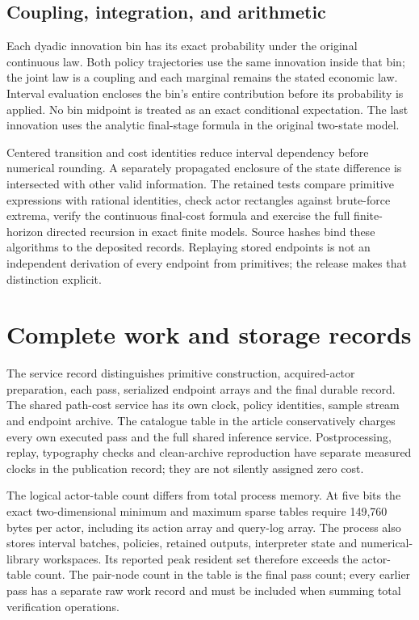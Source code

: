 \subsection{Coupling, integration, and arithmetic}
Each dyadic innovation bin has its exact probability under the original continuous law. Both policy trajectories use the same innovation inside that bin; the joint law is a coupling and each marginal remains the stated economic law. Interval evaluation encloses the bin's entire contribution before its probability is applied. No bin midpoint is treated as an exact conditional expectation. The last innovation uses the analytic final-stage formula in the original two-state model.

Centered transition and cost identities reduce interval dependency before numerical rounding. A separately propagated enclosure of the state difference is intersected with other valid information. The retained tests compare primitive expressions with rational identities, check actor rectangles against brute-force extrema, verify the continuous final-cost formula and exercise the full finite-horizon directed recursion in exact finite models. Source hashes bind these algorithms to the deposited records. Replaying stored endpoints is not an independent derivation of every endpoint from primitives; the release makes that distinction explicit.

\section{Complete work and storage records}\label{supp:work54}

The service record distinguishes primitive construction, acquired-actor preparation, each pass, serialized endpoint arrays and the final durable record. The shared path-cost service has its own clock, policy identities, sample stream and endpoint archive. The catalogue table in the article conservatively charges every own executed pass and the full shared inference service. Postprocessing, replay, typography checks and clean-archive reproduction have separate measured clocks in the publication record; they are not silently assigned zero cost.

The logical actor-table count differs from total process memory. At five bits the exact two-dimensional minimum and maximum sparse tables require 149,760 bytes per actor, including its action array and query-log array. The process also stores interval batches, policies, retained outputs, interpreter state and numerical-library workspaces. Its reported peak resident set therefore exceeds the actor-table count. The pair-node count in the table is the final pass count; every earlier pass has a separate raw work record and must be included when summing total verification operations.

